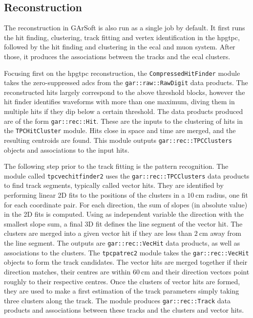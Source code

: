 \subsection{Reconstruction}

The reconstruction in GArSoft is also run as a single job by default. It first runs the hit finding, clustering, track fitting and vertex identification in the \gls{hpgtpc}, followed by the hit finding and clustering in the \gls{ecal} and muon system. After those, it produces the associations between the tracks and the \gls{ecal} clusters.

Focusing first on the \gls{hpgtpc} reconstruction, the \texttt{CompressedHitFinder} module takes the zero-suppressed \gls{adc}s from the \texttt{gar::raw::RawDigit} data products. The reconstructed hits largely correspond to the above threshold blocks, however the hit finder identifies waveforms with more than one maximum, diving them in multiple hits if they dip below a certain threshold. The data products produced are of the form \texttt{gar::rec::Hit}. These are the inputs to the clustering of hits in the \texttt{TPCHitCluster} module. Hits close in space and time are merged, and the resulting centroids are found. This module outputs \texttt{gar::rec::TPCClusters} objects and associations to the input hits.

The following step prior to the track fitting is the pattern recognition. The module called \texttt{tpcvechitfinder2} uses the \texttt{gar::rec::TPCClusters} data products to find track segments, typically called vector hits. They are identified by performing linear 2D fits to the positions of the clusters in a $10~\mathrm{cm}$ radius, one fit for each coordinate pair. For each direction, the sum of slopes (in absolute value) in the 2D fits is computed. Using as independent variable the direction with the smallest slope sum, a final 3D fit defines the line segment of the vector hit. The clusters are merged into a given vector hit if they are less than $2~\mathrm{cm}$ away from the line segment. The outputs are \texttt{gar::rec::VecHit} data products, as well as associations to the clusters. The \texttt{tpcpatrec2} module takes the \texttt{gar::rec::VecHit} objects to form the track candidates. The vector hits are merged together if their direction matches, their centres are within $60~\mathrm{cm}$ and their direction vectors point roughly to their respective centres. Once the clusters of vector hits are formed, they are used to make a first estimation of the track parameters simply taking three clusters along the track. The module produces \texttt{gar::rec::Track} data products and associations between these tracks and the clusters and vector hits.

